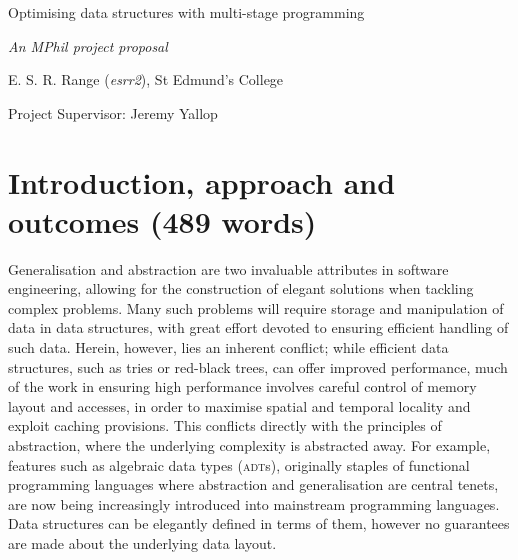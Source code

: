 \documentclass[11pt]{article}
\begin{document}
\centerline{\Large Optimising data structures with multi-stage programming}
\vspace{2em}
\centerline{\Large \emph{An MPhil project proposal}}
\vspace{2em}
\centerline{\large E. S. R. Range (\emph{esrr2}), St Edmund's College}
\vspace{1em}
\centerline{\large Project Supervisor: Jeremy Yallop}
\vspace{1em}


\section{Introduction, approach and outcomes (489 words)}



Generalisation and abstraction are two invaluable attributes in software engineering, allowing for the construction of elegant solutions when tackling complex problems. Many such problems will require storage and manipulation of data in data structures, with great effort devoted to ensuring efficient handling of such data. Herein, however, lies an inherent conflict; while efficient data structures, such as tries \cite{tries} or red-black \cite{rbt} trees, can offer improved performance, much of the work in ensuring high performance involves careful control of memory layout and accesses, in order to maximise spatial and temporal locality and exploit caching provisions. This conflicts directly with the principles of abstraction, where the underlying complexity is abstracted away. For example, features such as algebraic data types (\textsc{adt}s), originally staples of functional programming languages where abstraction and generalisation are central tenets, are now being increasingly introduced into mainstream programming languages. Data structures can be elegantly defined in terms of them, however no guarantees are made about the underlying data layout.
\end{document}
